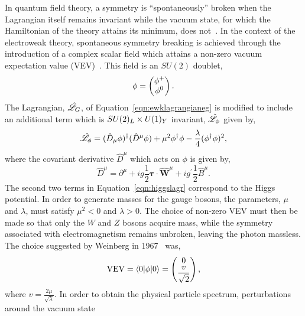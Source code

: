 In quantum field theory, a symmetry is ``spontaneously'' broken when the Lagrangian
itself remains invariant while the vacuum state, for which the Hamiltonian of the theory
attains its minimum, does not~\cite{aitchison}. In the context of the electroweak theory, 
spontaneous symmetry breaking is
achieved through the introduction of a complex scalar field which attains a non-zero 
vacuum expectation value (VEV)~\citep{Higgs:1964ia,PhysRev.155.1554,Higgs:1964pj,Guralnik:1964eu,PhysRev.145.1156}. 
This field is an $SU(2)$ doublet,
\begin{equation}
\phi = 
\everymath{\displaystyle} \begin{pmatrix}
\phi^{+} \\ 
\phi^{0}
\end{pmatrix}.
\end{equation}
The Lagrangian, $\hat{\mathscr{L}}_{G}$, of Equation~\ref{eqn:ewklagrangianeg} is modified to include
an additional term which is $SU(2)_{L}\times U(1)_{Y}$ invariant, $\hat{\mathscr{L}}_{\phi}$
given by, 
\begin{equation}
\hat{\mathscr{L}}_{\phi}=(\hat{D}_{\mu}\phi)^{\dagger}(\hat{D}^{\mu}\phi)  
	    +\mu^{2} \phi^{\dagger}\phi - \frac{\lambda}{4}(\phi^{\dagger}\phi)^{2},
\label{eqn:higgslagr}
\end{equation}
where the covariant derivative $\hat{D}^{\mu}$ which acts on $\phi$ is given by,
\begin{equation}
\hat{D}^{\mu} = \partial^{\mu} + ig\frac{1}{2}\boldsymbol{\tau}\cdot\hat{\mathbf{W}}^{\mu}
		+ ig^{\prime}\frac{1}{2} \hat{B}^{\mu}.
\end{equation}
The second two terms in Equation~\ref{eqn:higgslagr} correspond to the Higgs potential. 
In order to generate masses for the gauge bosons, the parameters, $\mu$ and $\lambda$,
must satisfy $\mu^{2}<0$ and $\lambda>0$. The choice of non-zero 
VEV must then be made so that only the $W$ and $Z$ bosons acquire mass, while the 
symmetry associated with electromagnetism remains unbroken, leaving the photon massless.
The choice suggested by Weinberg in 1967~\citep{weinberg} was,
\begin{equation}
\mathrm{VEV} = \langle0|\phi|0\rangle = 
\everymath{\displaystyle} \begin{pmatrix}
0 \\ 
\frac{v}{\sqrt{2}}
\end{pmatrix},
\end{equation}
where $v= \frac{\displaystyle 2\mu}{\displaystyle \sqrt{\lambda}}$. In order to 
obtain the physical particle spectrum, perturbations around the vacuum state
